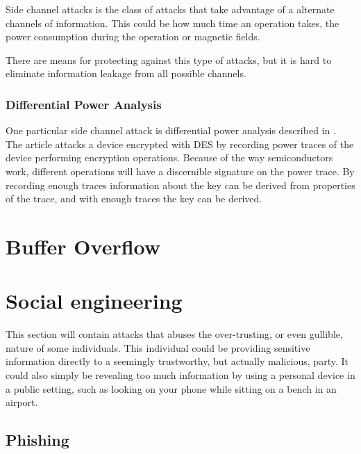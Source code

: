 Side channel attacks is the class of attacks that take advantage of a alternate channels of information.
This could be how much time an operation takes, the power consumption during the operation or magnetic fields.

There are means for protecting against this type of attacks, but it is hard to eliminate information leakage from all possible channels.

\subsubsection{Differential Power Analysis}\label{attack:dpa}
One particular side channel attack is differential power analysis described in \citet{DPA}.
The article attacks a device encrypted with DES by recording power traces of the device performing encryption operations.
Because of the way semiconductors work, different operations will have a discernible signature on the power trace.
By recording enough traces information about the key can be derived from properties of the trace, and with enough traces the key can be derived.

\section{Buffer Overflow}


\section{Social engineering}
This section will contain attacks that abuses the over-trusting, or even gullible, nature of some individuals.
This individual could be providing sensitive information directly to a seemingly trustworthy, but actually malicious, party.
It could also simply be revealing too much information by using a personal device in a public setting, such as looking on your phone while sitting on a bench in an airport.

\subsection{Phishing}\label{attack:phishing}

